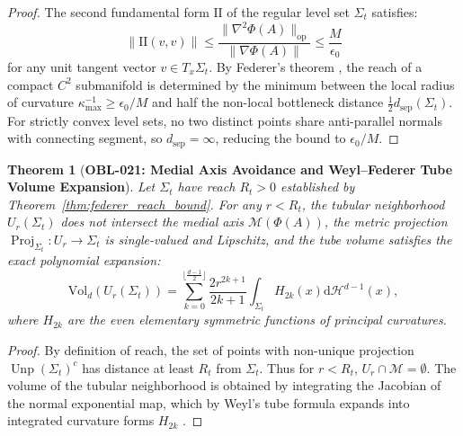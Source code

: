 \documentclass[11pt,a4paper,reqno]{amsart}
\newtheorem{theorem}{Theorem}[section]
\theoremstyle{definition}
\theoremstyle{remark}
\numberwithin{equation}{section}
\newcommand{\dif}{\mathrm{d}}
\DeclareMathOperator{\Unp}{Unp}
\DeclareMathOperator{\Proj}{Proj}
\begin{document}
\begin{proof}
The second fundamental form $\mathrm{II}$ of the regular level set $\Sigma_t$ satisfies:
\begin{equation}
\|\mathrm{II}(v, v)\| \le \frac{\|\nabla^2 \Phi(A)\|_{\mathrm{op}}}{\|\nabla \Phi(A)\|} \le \frac{M}{\epsilon_0}
\end{equation}
for any unit tangent vector $v \in T_x \Sigma_t$. By Federer's theorem \cite{Federer1959}, the reach of a compact $C^2$ submanifold is determined by the minimum between the local radius of curvature $\kappa_{\max}^{-1} \ge \epsilon_0 / M$ and half the non-local bottleneck distance $\frac{1}{2} d_{\mathrm{sep}}(\Sigma_t)$. For strictly convex level sets, no two distinct points share anti-parallel normals with connecting segment, so $d_{\mathrm{sep}} = \infty$, reducing the bound to $\epsilon_0 / M$.
\end{proof}

\begin{theorem}[\textbf{OBL-021: Medial Axis Avoidance and Weyl--Federer Tube Volume Expansion}]
\label{thm:tube_volume_reach}
Let $\Sigma_t$ have reach $R_t > 0$ established by Theorem~\ref{thm:federer_reach_bound}. For any $r < R_t$, the tubular neighborhood $U_r(\Sigma_t)$ does not intersect the medial axis $\mathcal{M}(\Phi(A))$, the metric projection $\Proj_{\Sigma_t} \colon U_r \to \Sigma_t$ is single-valued and Lipschitz, and the tube volume satisfies the exact polynomial expansion:
\begin{equation}
\mathrm{Vol}_d(U_r(\Sigma_t)) = \sum_{k=0}^{\lfloor \frac{d-1}{2} \rfloor} \frac{2 r^{2k+1}}{2k+1} \int_{\Sigma_t} H_{2k}(x) \dif\mathcal{H}^{d-1}(x),
\end{equation}
where $H_{2k}$ are the even elementary symmetric functions of principal curvatures.
\end{theorem}

\begin{proof}
By definition of reach, the set of points with non-unique projection $\Unp(\Sigma_t)^c$ has distance at least $R_t$ from $\Sigma_t$. Thus for $r < R_t$, $U_r \cap \mathcal{M} = \emptyset$. The volume of the tubular neighborhood is obtained by integrating the Jacobian of the normal exponential map, which by Weyl's tube formula expands into integrated curvature forms $H_{2k}$ \cite{Federer1959}.
\end{proof}

\end{document}
